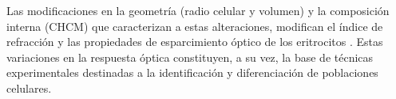 Las modificaciones en la geometría (radio celular y volumen) y la composición interna (CHCM) que caracterizan a estas alteraciones, modifican el índice de refracción y las propiedades de esparcimiento óptico de los eritrocitos \cite{bosschaartLiteratureReviewNovel2014}. Estas variaciones en la respuesta óptica constituyen, a su vez, la base de técnicas experimentales destinadas a la identificación y diferenciación de poblaciones celulares.



